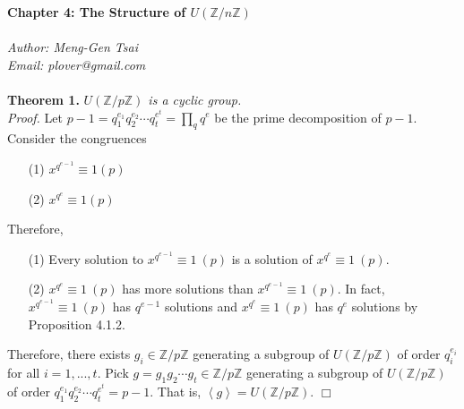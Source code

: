 \documentclass{article}
\begin{document}
\textbf{\Large Chapter 4: The Structure of $U(\mathbb{Z}/n\mathbb{Z})$} \\\\



\emph{Author: Meng-Gen Tsai} \\
\emph{Email: plover@gmail.com} \\\\




\textbf{Theorem 1.} \emph{$U(\mathbb{Z}/p\mathbb{Z})$ is a cyclic group.} \\

\emph{Proof.}
Let $p - 1 = q_1^{e_1} q_2^{e_2} \cdots q_t^{e^t} = \prod_{q} q^e$ be the prime
decomposition of $p - 1$. Consider the congruences

\begin{enumerate}
\item[(1)]
$x^{q^{e-1}} \equiv 1 (p)$
\item[(2)]
$x^{q^{e}} \equiv 1 (p)$
\end{enumerate}

Therefore,

\begin{enumerate}
\item[(1)]
Every solution to $x^{q^{e-1}} \equiv 1 \: (p)$ is a solution of $x^{q^{e}} \equiv 1 \: (p)$.
\item[(2)]
$x^{q^{e}} \equiv 1 \: (p)$ has more solutions than $x^{q^{e-1}} \equiv 1 \: (p)$.
In fact, $x^{q^{e-1}} \equiv 1 \: (p)$ has $q^{e-1}$ solutions and $x^{q^{e}} \equiv 1 \: (p)$
has $q^{e}$ solutions by Proposition 4.1.2.
\end{enumerate}

Therefore, there exists $g_i \in \mathbb{Z}/p\mathbb{Z}$ generating a subgroup of
$U(\mathbb{Z}/p\mathbb{Z})$ of order $q_i^{e_i}$ for all $i = 1, ..., t$.
Pick $g = g_1 g_2 \cdots g_t \in \mathbb{Z}/p\mathbb{Z}$ generating a subgroup of
$U(\mathbb{Z}/p\mathbb{Z})$ of order $q_1^{e_1} q_2^{e_2} \cdots q_t^{e^t} = p - 1$.
That is, $\left \langle g \right \rangle = U(\mathbb{Z}/p\mathbb{Z})$.
$\Box$ \\\\
\end{document}
